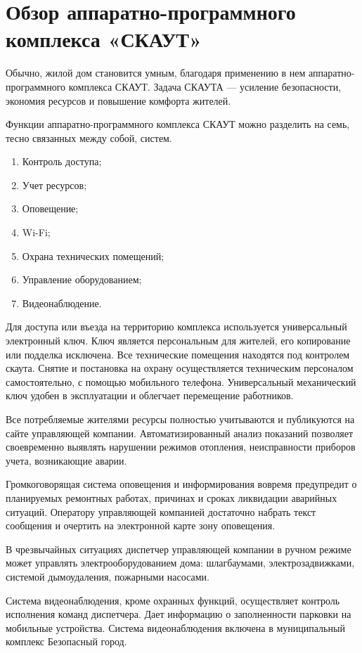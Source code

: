 
\section{Обзор аппаратно-программного комплекса «СКАУТ»}
Обычно, жилой дом становится умным, благодаря применению в нем аппаратно-программного комплекса СКАУТ. Задача СКАУТА --- усиление безопасности, экономия ресурсов и повышение комфорта жителей. \cite{Almanah}

Функции аппаратно-программного комплекса СКАУТ можно разделить на семь, тесно связанных между собой, систем.
\begin{enumerate}
	\item Контроль доступа; 
	\item Учет ресурсов;
	\item Оповещение;
	\item Wi-Fi;
	\item Охрана технических помещений;
	\item Управление оборудованием;
	\item Видеонаблюдение.
\end{enumerate} 

Для доступа или въезда на территорию комплекса используется универсальный электронный ключ. Ключ является персональным для жителей, его копирование или подделка исключена. Все технические помещения находятся под контролем скаута. Снятие и постановка на охрану осуществляется техническим персоналом самостоятельно, с помощью мобильного телефона. Универсальный механический ключ удобен в эксплуатации и облегчает перемещение работников. 

Все потребляемые жителями ресурсы полностью учитываются и публикуются на сайте управляющей компании. Автоматизированный анализ показаний позволяет своевременно выявлять нарушении режимов отопления, неисправности приборов учета, возникающие аварии. 

Громкоговорящая система оповещения и информирования вовремя предупредит о планируемых ремонтных работах, причинах и сроках ликвидации аварийных ситуаций. Оператору управляющей компанией достаточно набрать текст сообщения и очертить на электронной карте зону оповещения. 

В чрезвычайных ситуациях диспетчер управляющей компании в ручном режиме может управлять электрооборудованием дома: шлагбаумами, электрозадвижками, системой дымоудаления, пожарными насосами.

Система видеонаблюдения, кроме охранных функций, осуществляет контроль исполнения команд диспетчера. Дает информацию о заполненности парковки на мобильные устройства. Система видеонаблюдения включена в муниципальный комплекс Безопасный город.


